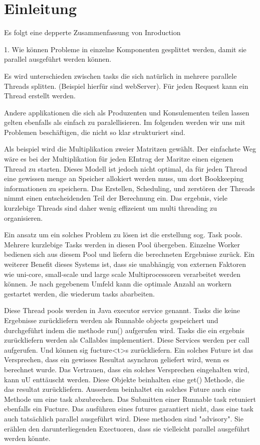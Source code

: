\section{Einleitung}


Es folgt eine depperte Zusammenfassung von Inroduction


1. Wie können Probleme in einzelne Komponenten gesplittet werden, damit sie parallel ausgeführt werden können.


Es wird unterschieden zwischen tasks die sich natürlich in mehrere parallele Threads splitten. (Beispiel hierfür sind webServer). Für jeden Request kann ein Thread erstellt werden.

Andere applikationen die sich als Produzenten und Konsulementen teilen lassen gelten ebenfalls als einfach zu paralellisieren. Im folgenden werden wir uns mit Problemen beschäftigen, die nicht so klar strukturiert sind.

Als beispiel wird die Multiplikation zweier Matritzen gewählt. Der einfachste Weg wäre es bei der Multiplikation für jeden EIntrag der Maritze einen eigenen Thread zu starten. Dieses Modell ist jedoch nicht optimal, da für jeden Thread eine gewissen menge an Speicher allokiert werden muss, um dort Bookkeeping informationen zu speichern. Das Erstellen, Scheduling, und zerstören der Threads nimmt einen entscheidenden Teil der Berechnung ein. Das ergebnis, viele kurzlebige Threads sind daher wenig effizeient um multi threading zu organisieren.


Ein ansatz um ein solches Problem zu lösen ist die erstellung sog. Task pools. Mehrere kurzlebige Tasks werden in diesen Pool übergeben. Einzelne Worker bedienen sich aus diesem Pool und liefern die berechneten Ergebnisse zurück. Ein weiterer Benefit dieses Systems ist, dass sie unabhängig von externen Faktoren wie uni-core, small-scale und large scale Multiprocessoren verarbeitet werden können. Je nach gegebenem Umfeld kann die optimale Anzahl an workern gestartet werden, die wiederum tasks abarbeiten.

Diese Thread pools werden in Java executor service genannt. Tasks die keine Ergebnisse zurückliefern werden als Runnable objects gespeichert und durchgeführt indem die methode run() aufgerufen wird. Tasks die ein ergebnis zurückliefern werden als Callables implementiert. Diese Services werden per call aufgerufen. Und können sig fucture<t>s zurückliefern. Ein solches Future ist das Versprechen, dass ein gewisses Resultat asynchron geliefert wird, wenn es berechnet wurde. Das Vertrauen, dass ein solches Versprechen eingehalten wird, kann uU enttäuscht werden. Diese Objekte beinhalten eine get() Methode, die das resultat zurückliefern. Ausserdem beinhaltet ein solches Future auch eine Methode um eine task abzubrechen. Das Submitten einer Runnable task retuniert ebenfalls ein Fucture. Das ausführen eines futures garantiert nicht, dass eine task auch tatsächlich parallel ausgeführt wird. Diese methoden sind "advisory". Sie erählen den darunterliegenden Exectuoren, dass sie vielleicht parallel ausgeführt werden könnte.

